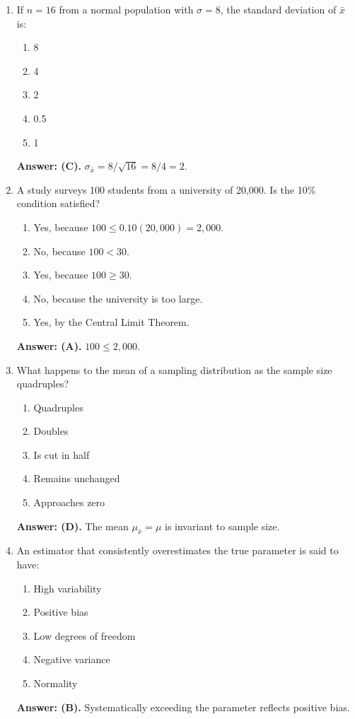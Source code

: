 \begin{enumerate}[resume, leftmargin=1.5em]
  \item If $n = 16$ from a normal population with $\sigma = 8$, the standard deviation of $\bar{x}$ is:
  \begin{enumerate}[label=(\Alph*)]
    \item 8 \item 4 \item 2 \item 0.5 \item 1
  \end{enumerate}
  \textbf{Answer: (C).} $\sigma_{\bar{x}} = 8/\sqrt{16} = 8/4 = 2$.

  \item A study surveys 100 students from a university of 20,000. Is the 10\% condition satisfied?
  \begin{enumerate}[label=(\Alph*)]
    \item Yes, because $100 \le 0.10(20,000) = 2,000$.
    \item No, because $100 < 30$.
    \item Yes, because $100 \ge 30$.
    \item No, because the university is too large.
    \item Yes, by the Central Limit Theorem.
  \end{enumerate}
  \textbf{Answer: (A).} $100 \le 2,000$.

  \item What happens to the mean of a sampling distribution as the sample size quadruples?
  \begin{enumerate}[label=(\Alph*)]
    \item Quadruples \item Doubles \item Is cut in half \item Remains unchanged \item Approaches zero
  \end{enumerate}
  \textbf{Answer: (D).} The mean $\mu_{\bar{x}} = \mu$ is invariant to sample size.

  \item An estimator that consistently overestimates the true parameter is said to have:
  \begin{enumerate}[label=(\Alph*)]
    \item High variability \item Positive bias \item Low degrees of freedom \item Negative variance \item Normality
  \end{enumerate}
  \textbf{Answer: (B).} Systematically exceeding the parameter reflects positive bias.


\end{enumerate}
